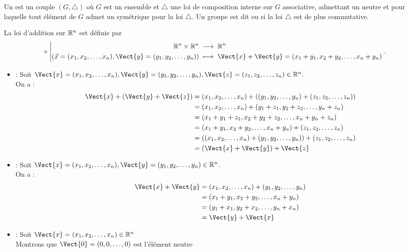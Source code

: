 \documentclass{book}
\begin{document}
\begin{Definition}[Groupe]
Un  est un couple $(G,\bigtriangleup)$ où $G$ est un ensemble et $\bigtriangleup$ une loi de composition interne sur $G$ associative, admettant un neutre et pour laquelle tout élément de $G$ admet un symétrique pour la loi $\bigtriangleup$.
Un groupe est dit  ou  si la loi $\bigtriangleup$ est de plus commutative.
\end{Definition}
\begin{Exemple}[Le Groupe \((\R^n,+)\) ]
La loi d'addition sur $\mathbb{R}^n$ est définie par 
$$ \Fonction{+}{\R^n\times\R^n}{\R^n}{(\vec{x}=(x_1,x_2,\dots,x_n),\Vect{y}=(y_1,y_2,\dots,y_n))}{\Vect{x}+\Vect{y}=(x_1+y_1, x_2+y_2, \dots, x_n+y_n)}.$$

\begin{itemize}
\item  {} : Soit $\Vect{x}=(x_1,x_2,\dots,x_n),\Vect{y}=(y_1,y_2,\dots,y_n),\Vect{z}=(z_1,z_2,\dots,z_n)\in\R^n .$\\
 On a :
 $$\begin{aligned}
 \Vect{x}+(\Vect{y}+\Vect{z})&=(x_1,x_2,\dots,x_n)+\left((y_1,y_2,\dots,y_n)+(z_1,z_2,\dots,z_n)\right)\\
 &=(x_1,x_2,\dots,x_n)+(y_1+z_1, y_2+z_2, \dots, y_n+z_n)\\
 &=(x_1+y_1+z_1, x_2+y_2+z_2, \dots, x_n+y_n+z_n)\\
  &=(x_1+y_1, x_2+y_2, \dots, x_n+y_n)+(z_1,z_2,\dots,z_n)\\
  &=\left((x_1,x_2,\dots,x_n)+(y_1,y_2,\dots,y_n)\right)+(z_1,z_2,\dots,z_n)\\
  &=(\Vect{x}+\Vect{y})+\Vect{z}
 \end{aligned}$$
 \item  {} : Soit $\Vect{x}=(x_1,x_2,\dots,x_n),\Vect{y}=(y_1,y_2,\dots,y_n)\in\R^n .$\\
 On a :
 $$\begin{aligned}
 \Vect{x}+\Vect{y}&=(x_1,x_2,\dots,x_n)+(y_1,y_2,\dots,y_n)\\
  &=(x_1+y_1, x_2+y_2, \dots, x_n+y_n)\\
  &=(y_1+x_1, y_2+x_2, \dots, y_n+x_n)\\
  &=\Vect{y}+\Vect{x}
 \end{aligned}$$
 \item  {} : Soit $\Vect{x}=(x_1,x_2,\dots,x_n)\in\R^n$\\
 Montrons que $\Vect{0}=(0,0,\dots,0)$ est l'élément neutre\\

\end{itemize}
\end{Exemple}
\end{document}
